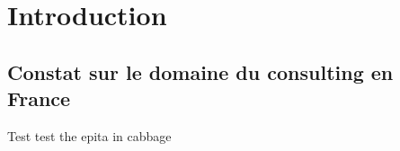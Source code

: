 \chapter{Introduction}

\section{Constat sur le domaine du consulting en France}

Test \autocite{mrx05}
test the \gls{epita} in \gls{cabbage}

\clearpage
